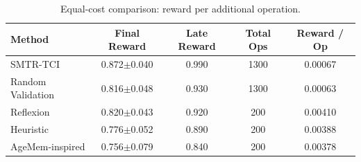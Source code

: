 \begin{table}[t]
\caption{Equal-cost comparison: reward per additional operation.}
\label{tab:cost_fair}
\centering
\begin{tabular}{l c c c c}
\toprule
Method & Final Reward & Late Reward & Total Ops & Reward / Op \\
\midrule
SMTR-TCI & 0.872$\pm$0.040 & 0.990 & 1300 & 0.00067 \\
Random Validation & 0.816$\pm$0.048 & 0.930 & 1300 & 0.00063 \\
Reflexion & 0.820$\pm$0.043 & 0.920 & 200 & 0.00410 \\
Heuristic & 0.776$\pm$0.052 & 0.890 & 200 & 0.00388 \\
AgeMem-inspired & 0.756$\pm$0.079 & 0.840 & 200 & 0.00378 \\
\bottomrule
\end{tabular}
\end{table}
